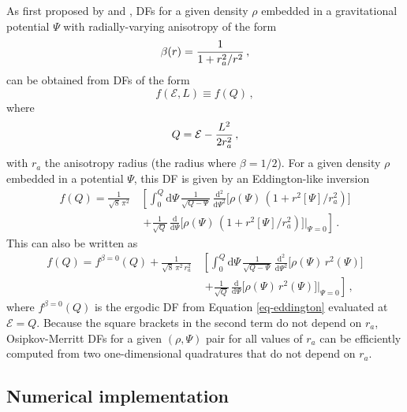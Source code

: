 As first proposed by \citet{osipkov79} and \citet{merritt85}, DFs for a given density $\rho$ embedded in a gravitational potential $\Psi$ with radially-varying anisotropy of the form
\begin{equation}\label{eq-anidf-osipkov}
    \beta(r) = {1 \over 1+r_a^2/r^2}\,,
\end{equation}
can be obtained from DFs of the form
\begin{equation}
    f(\mathcal{E},L) \equiv f(Q)\,,
\end{equation}
where
\begin{equation}
    Q = \mathcal{E}-{L^2 \over 2r_a^2}\,,
\end{equation}
with $r_a$ the anisotropy radius (the radius where $\beta = 1/2$). For a given density $\rho$ embedded in a potential $\Psi$, this DF is given by an Eddington-like inversion
\begin{equation}
\begin{split}
    f(Q) =  \frac{1}{\sqrt{8}\,\pi^2}\,& \left[ \int_0^Q\mathrm{d}\Psi\,\frac{1}{\sqrt{Q-\Psi}}\,\frac{\mathrm{d}^2}{\mathrm{d}\Psi^2}\Big[\rho(\Psi)\,(1+r^2[\Psi]/r_a^2)\Big]\right.\\&  \ \left. +\frac{1}{\sqrt{Q}}\,\frac{\mathrm{d}}{\mathrm{d}\Psi}\Big[\rho(\Psi)\,(1+r^2[\Psi]/r_a^2)\Big]\Big|_{\Psi=0}\right]\,.
\end{split}
\end{equation}
This can also be written as
\begin{equation}\label{eq-spherdf-omdf}
\begin{split}
    f(Q) = f^{\beta=0}(Q)+\frac{1}{\sqrt{8}\,\pi^2\,r_a^2}\,&\left[\int_0^Q\mathrm{d}\Psi\,\frac{1}{\sqrt{Q-\Psi}}\,\frac{\mathrm{d}^2}{\mathrm{d}\Psi^2}\Big[\rho(\Psi)\,r^2(\Psi)\Big]\right.\\ & \ \left.+\frac{1}{\sqrt{Q}}\,\frac{\mathrm{d}}{\mathrm{d}\Psi}\Big[\rho(\Psi)\,r^2(\Psi)\Big]\Big|_{\Psi=0}\right]\,,
\end{split}
\end{equation}
where $f^{\beta=0}(Q)$ is the ergodic DF from Equation \eqref{eq-eddington} evaluated at $\mathcal{E} = Q$. Because the square brackets in the second term do not depend on $r_a$, Osipkov-Merritt DFs for a given $(\rho,\Psi)$ pair for all values of $r_a$ can be efficiently computed from two one-dimensional quadratures that do not depend on $r_a$.

\subsection{Numerical implementation}


